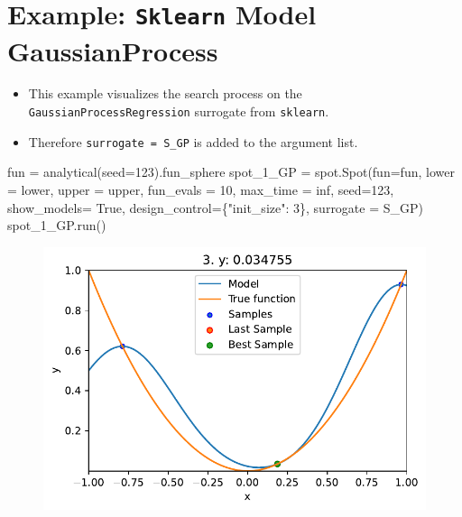 \documentclass[
  letterpaper,
  DIV=11,
  numbers=noendperiod]{scrreprt}
\newenvironment{Shaded}{\begin{snugshade}}{\end{snugshade}}
\newcommand{\DecValTok}[1]{\textcolor[rgb]{0.68,0.00,0.00}{#1}}
\newcommand{\NormalTok}[1]{\textcolor[rgb]{0.00,0.23,0.31}{#1}}
\newcommand{\OperatorTok}[1]{\textcolor[rgb]{0.37,0.37,0.37}{#1}}
\newcommand{\StringTok}[1]{\textcolor[rgb]{0.13,0.47,0.30}{#1}}
\newcommand{\VariableTok}[1]{\textcolor[rgb]{0.07,0.07,0.07}{#1}}
\providecommand{\tightlist}{%
  \setlength{\itemsep}{0pt}\setlength{\parskip}{0pt}}\usepackage{longtable,booktabs,array}
\begin{document}
\hypertarget{example-sklearn-model-gaussianprocess}{%
\section{\texorpdfstring{Example: \texttt{Sklearn} Model
GaussianProcess}{Example: Sklearn Model GaussianProcess}}\label{example-sklearn-model-gaussianprocess}}

\begin{itemize}
\tightlist
\item
  This example visualizes the search process on the
  \texttt{GaussianProcessRegression} surrogate from \texttt{sklearn}.
\item
  Therefore \texttt{surrogate\ =\ S\_GP} is added to the argument list.
\end{itemize}

\begin{Shaded}
\begin{Highlighting}[]
\NormalTok{fun }\OperatorTok{=}\NormalTok{ analytical(seed}\OperatorTok{=}\DecValTok{123}\NormalTok{).fun\_sphere}
\NormalTok{spot\_1\_GP }\OperatorTok{=}\NormalTok{ spot.Spot(fun}\OperatorTok{=}\NormalTok{fun,}
\NormalTok{                   lower }\OperatorTok{=}\NormalTok{ lower,}
\NormalTok{                   upper }\OperatorTok{=}\NormalTok{ upper,}
\NormalTok{                   fun\_evals }\OperatorTok{=} \DecValTok{10}\NormalTok{,}
\NormalTok{                   max\_time }\OperatorTok{=}\NormalTok{ inf,}
\NormalTok{                   seed}\OperatorTok{=}\DecValTok{123}\NormalTok{,}
\NormalTok{                   show\_models}\OperatorTok{=} \VariableTok{True}\NormalTok{,}
\NormalTok{                   design\_control}\OperatorTok{=}\NormalTok{\{}\StringTok{"init\_size"}\NormalTok{: }\DecValTok{3}\NormalTok{\},}
\NormalTok{                   surrogate }\OperatorTok{=}\NormalTok{ S\_GP)}
\NormalTok{spot\_1\_GP.run()}
\end{Highlighting}
\end{Shaded}

\begin{figure}[H]

{\centering \includegraphics{010_num_spot_sklearn_surrogate_files/figure-pdf/cell-25-output-1.pdf}

}

\end{figure}
\end{document}
